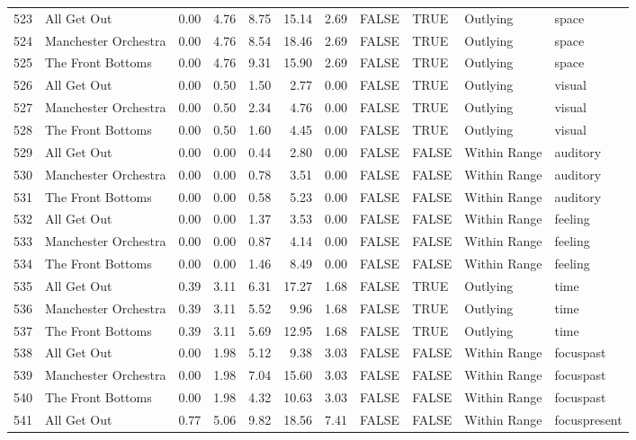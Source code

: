 \begin{table}[ht]
\begin{tabular}{rlrrrrrllll}
  523 & All Get Out & 0.00 & 4.76 & 8.75 & 15.14 & 2.69 & FALSE & TRUE & Outlying & space \\ 
  524 & Manchester Orchestra & 0.00 & 4.76 & 8.54 & 18.46 & 2.69 & FALSE & TRUE & Outlying & space \\ 
  525 & The Front Bottoms & 0.00 & 4.76 & 9.31 & 15.90 & 2.69 & FALSE & TRUE & Outlying & space \\ 
  526 & All Get Out & 0.00 & 0.50 & 1.50 & 2.77 & 0.00 & FALSE & TRUE & Outlying & visual \\ 
  527 & Manchester Orchestra & 0.00 & 0.50 & 2.34 & 4.76 & 0.00 & FALSE & TRUE & Outlying & visual \\ 
  528 & The Front Bottoms & 0.00 & 0.50 & 1.60 & 4.45 & 0.00 & FALSE & TRUE & Outlying & visual \\ 
  529 & All Get Out & 0.00 & 0.00 & 0.44 & 2.80 & 0.00 & FALSE & FALSE & Within Range & auditory \\ 
  530 & Manchester Orchestra & 0.00 & 0.00 & 0.78 & 3.51 & 0.00 & FALSE & FALSE & Within Range & auditory \\ 
  531 & The Front Bottoms & 0.00 & 0.00 & 0.58 & 5.23 & 0.00 & FALSE & FALSE & Within Range & auditory \\ 
  532 & All Get Out & 0.00 & 0.00 & 1.37 & 3.53 & 0.00 & FALSE & FALSE & Within Range & feeling \\ 
  533 & Manchester Orchestra & 0.00 & 0.00 & 0.87 & 4.14 & 0.00 & FALSE & FALSE & Within Range & feeling \\ 
  534 & The Front Bottoms & 0.00 & 0.00 & 1.46 & 8.49 & 0.00 & FALSE & FALSE & Within Range & feeling \\ 
  535 & All Get Out & 0.39 & 3.11 & 6.31 & 17.27 & 1.68 & FALSE & TRUE & Outlying & time \\ 
  536 & Manchester Orchestra & 0.39 & 3.11 & 5.52 & 9.96 & 1.68 & FALSE & TRUE & Outlying & time \\ 
  537 & The Front Bottoms & 0.39 & 3.11 & 5.69 & 12.95 & 1.68 & FALSE & TRUE & Outlying & time \\ 
  538 & All Get Out & 0.00 & 1.98 & 5.12 & 9.38 & 3.03 & FALSE & FALSE & Within Range & focuspast \\ 
  539 & Manchester Orchestra & 0.00 & 1.98 & 7.04 & 15.60 & 3.03 & FALSE & FALSE & Within Range & focuspast \\ 
  540 & The Front Bottoms & 0.00 & 1.98 & 4.32 & 10.63 & 3.03 & FALSE & FALSE & Within Range & focuspast \\ 
  541 & All Get Out & 0.77 & 5.06 & 9.82 & 18.56 & 7.41 & FALSE & FALSE & Within Range & focuspresent \\ 

\end{tabular}
\end{table}
